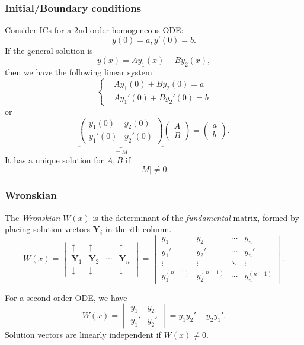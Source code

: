 \documentclass[a4paper]{article}
\begin{document}
    \subsubsection{Initial/Boundary conditions}
    Consider ICs for a 2nd order homogeneous ODE: 
    \[
        y(0)=a, y'(0)=b
    .\]
    If the general solution is 
    \[
        y(x)=Ay_1(x)+By_2(x)
    ,\]
    then we have the following linear system 
    \[
        \left\{ \begin{aligned}
            &Ay_1(0)+By_2(0)=a\\
            &Ay_1'(0)+By_2'(0)=b
        \end{aligned}\right.  
    \]
    or
    \[
        \underbrace{\begin{pmatrix}
            y_1(0)&y_2(0)\\
            y_1'(0)&y_2'(0)
        \end{pmatrix}}_{=M}
        \begin{pmatrix}
            A\\B
        \end{pmatrix}
        =
        \begin{pmatrix}
            a\\b
        \end{pmatrix}
    .\]
    It has a unique solution for $A,B$ if 
    \[
        |M|\neq 0
    .\] 
    \newpage
    \subsubsection{Wronskian}
    \begin{definition}
        The \textit{Wronskian} $ W(x) $ is the determinant of the \textit{fundamental} matrix, formed by placing solution vectors $ \mathbf{Y}_i $ in the $i$th column.
        \[
            W(x)=
            \begin{vmatrix}
                \uparrow &\uparrow &&\uparrow \\
                \mathbf{Y}_1&\mathbf{Y}_2&\cdots & \mathbf{Y}_n\\
                \downarrow & \downarrow & &  \downarrow
            \end{vmatrix}=
            \begin{vmatrix}y_{1}&y_{2}&\cdots &y_{n}\\y_{1}'&y_{2}'&\cdots &y_{n}'\\\vdots &\vdots &\ddots &\vdots \\y_{1}^{{(n-1)}}&y_{2}^{{(n-1)}}&\cdots &y_{n}^{{(n-1)}}\end{vmatrix}
        .\]
    \end{definition}
    For a second order ODE, we have 
    \begin{equation}\label{eq:12.4}
        W(x)=\begin{vmatrix}
            y_1&y_2\\
            y_1'&y_2'
        \end{vmatrix}=y_1y_2'-y_2y_1'.
    \end{equation}
    Solution vectors are linearly independent if $W(x)\neq 0$.
\end{document}
